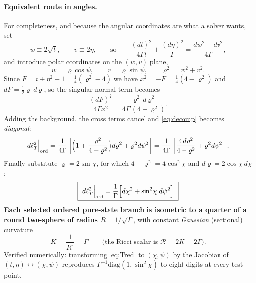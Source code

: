 \paragraph{Equivalent route in angles.} For completeness, and because the angular
coordinates are what a solver wants, set
\begin{equation}
  w\equiv2\sqrt t,\qquad v\equiv2\eta,
  \qquad\text{so}\qquad
  \frac{(dt)^{2}}{4\Gamma t}+\frac{(d\eta)^{2}}{\Gamma}=\frac{dw^{2}+dv^{2}}{4\Gamma},
\end{equation}
and introduce polar coordinates on the $(w,v)$ plane,
\begin{equation}
  w=\varrho\cos\psi,\qquad v=\varrho\sin\psi,\qquad \varrho^{2}=w^{2}+v^{2} .
\end{equation}
Since $F=t+\eta^{2}-1=\tfrac14(\varrho^{2}-4)$ we have $x^{2}=-F=\tfrac14(4-\varrho^{2})$ and
$dF=\tfrac12\varrho\,d\varrho$, so the singular normal term becomes
\begin{equation}
  \frac{(dF)^{2}}{4\Gamma x^{2}}=\frac{\varrho^{2}\,d\varrho^{2}}{4\Gamma\,(4-\varrho^{2})} .
\end{equation}
Adding the background, the cross terms cancel and \eqref{eq:decomp} becomes \emph{diagonal}:
\begin{equation}
  d\ell_T^{2}\Big|_{\rm ord}
   =\frac{1}{4\Gamma}\left[\Big(1+\frac{\varrho^{2}}{4-\varrho^{2}}\Big)d\varrho^{2}
    +\varrho^{2}d\psi^{2}\right]
   =\frac{1}{4\Gamma}\left[\frac{4\,d\varrho^{2}}{4-\varrho^{2}}+\varrho^{2}d\psi^{2}\right].
  \label{eq:polar}
\end{equation}
Finally substitute $\varrho=2\sin\chi$, for which $4-\varrho^{2}=4\cos^{2}\chi$ and
$d\varrho=2\cos\chi\,d\chi$:
\begin{equation}
  \boxed{\ d\ell_T^{2}\Big|_{\rm ord}=\frac{1}{\Gamma}\Big[d\chi^{2}+\sin^{2}\!\chi\;d\psi^{2}\Big]\ }
  \label{eq:sphere}
\end{equation}
\textbf{Each selected ordered pure-state branch is isometric to a quarter of a round
two-sphere of radius $R=1/\sqrt\Gamma$}, with constant \emph{Gaussian} (sectional) curvature
\begin{equation}
  K=\frac{1}{R^{2}}=\Gamma
  \qquad\text{(the Ricci scalar is }\mathcal R=2K=2\Gamma\text{)} .
\end{equation}
Verified numerically: transforming \eqref{eq:Tred} to $(\chi,\psi)$ by the Jacobian of
$(t,\eta)\leftrightarrow(\chi,\psi)$ reproduces $\Gamma^{-1}\mathrm{diag}(1,\sin^{2}\chi)$ to
eight digits at every test point.

